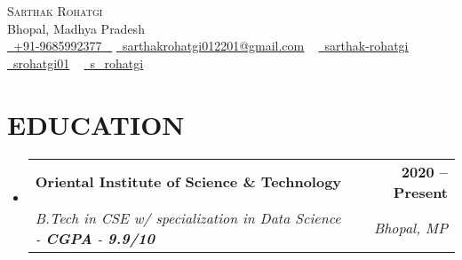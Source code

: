\documentclass[letterpaper,11pt]{article}
\makeatletter
\newcommand{\resumeSubheading}[4]{
  \vspace{-2pt}\item
    \begin{tabular*}{1.0\textwidth}[t]{l@{\extracolsep{\fill}}r}
      \textbf{\large#1} & \textbf{\small #2} \\
      \textit{\large#3} & \textit{\small #4} \\
      
    \end{tabular*}\vspace{-7pt}
}
\newcommand{\resumeSubHeadingListStart}{\begin{itemize}[leftmargin=0.0in, label={}]}
\newcommand{\resumeSubHeadingListEnd}{\end{itemize}}
\makeatother
\begin{document}


\begin{center}
    {\Huge \scshape Sarthak Rohatgi} \\ \vspace{1pt}
    Bhopal, Madhya Pradesh \\ \vspace{1pt}
    \small \href{tel:+919685992377}{ \raisebox{-0.1\height}\faPhone\ \underline{+91-9685992377} ~} \href{mailto:sarthakrohatgi012201@gmail.com}{\raisebox{-0.2\height}\faEnvelope\  \underline{sarthakrohatgi012201@gmail.com}} ~ 
    \href{https://linkedin.com/in/sarthak-rohatgi}{\raisebox{-0.2\height}\faLinkedinSquare\ \underline{sarthak-rohatgi}}  ~
    \href{https://github.com/srohatgi01}{\raisebox{-0.2\height}\faGithub\ \underline{srohatgi01}} ~
    \href{https://www.hackerrank.com/s_rohatgi}{\raisebox{-0.2\height}\faHackerrank\ \underline{s\_rohatgi}} ~
    \vspace{-8pt}
\end{center}


\section{EDUCATION}
  \resumeSubHeadingListStart
    \resumeSubheading
      {Oriental Institute of Science \& Technology}{2020 -- Present}
      {B.Tech in CSE w/ specialization in Data Science - \textbf{CGPA} - \textbf{9.9/10}}{Bhopal, MP}
  \resumeSubHeadingListEnd
  

\end{document}
